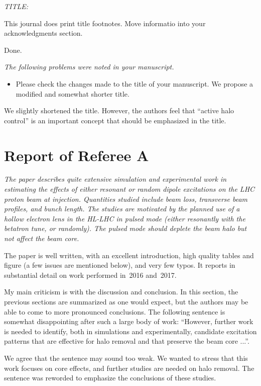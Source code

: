 \documentclass[aps
,prstab
,preprint,tightenlines
,amsfonts,amssymb,amsmath
]{revtex4-1}
\newenvironment{co}{\em}{}
\newcommand{\bco}{\begin{co}}
\newcommand{\eco}{\end{co}}
\newenvironment{re}{\color{NavyBlue}}{}
\newcommand{\bre}{\begin{re}}
\newcommand{\ere}{\end{re}}
\begin{document}
\bco
TITLE:

This journal does print title footnotes.  Move informatio into your
acknowledgments section.
\eco

\bre Done.\ere

\bco
The following problems were noted in your manuscript.

\begin{itemize}
\item Please check the changes made to the title of your manuscript.
  We propose a modified and somewhat shorter title.
\end{itemize}
\eco

\bre We slightly shortened the title. However, the authors feel that
``active halo control'' is an important concept that should be
emphasized in the title. \ere


\section*{Report of Referee A}

\bco
The paper describes quite extensive simulation and experimental work 
in estimating the effects of either resonant or random dipole 
excitations on the LHC proton beam at injection. Quantities studied 
include beam loss, transverse beam profiles, and bunch length. The 
studies are motivated by the planned use of a hollow electron lens in 
the HL-LHC in pulsed mode (either resonantly with the betatron tune, 
or randomly). The pulsed mode should deplete the beam halo but not 
affect the beam core. 

The paper is well written, with an excellent introduction, high 
quality tables and figure (a few issues are mentioned below), and very 
few typos. It reports in substantial detail on work performed in~2016 
and~2017. 

My main criticism is with the discussion and conclusion. In this 
section, the previous sections are summarized as one would expect, but 
the authors may be able to come to more pronounced conclusions. The 
following sentence is somewhat disappointing after such a large body 
of work: ``However, further work is needed to identify, both in 
simulations and experimentally, candidate excitation patterns that are 
effective for halo removal and that preserve the beam core ...''. 
\eco

\bre We agree that the sentence may sound too weak. We wanted to
stress that this work focuses on core effects, and further studies are
needed on halo removal. The sentence was reworded to emphasize the
conclusions of these studies.  \ere
\end{document}
